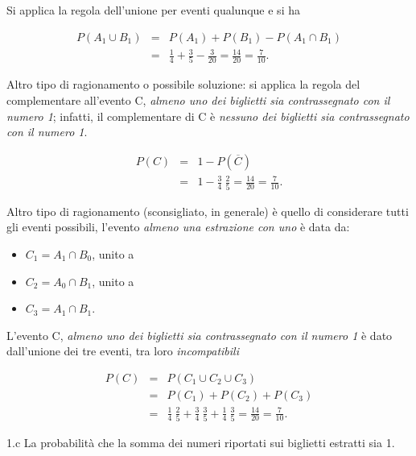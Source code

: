 \documentclass[
  11pt,
]{book}
\providecommand{\tightlist}{%
  \setlength{\itemsep}{0pt}\setlength{\parskip}{0pt}}
\theoremstyle{mytheoremstyle}
\theoremstyle{mydefstyle}
\newenvironment{sol}
  {
  \begin{tcolorbox}[enhanced,breakable,arc=0.1mm,boxrule=1pt,colback=white,colframe=iblue,
  title=\bf \fontfamily{lmss}\selectfont \hspace{.5 cm} Soluzione,drop fuzzy shadow]

}{
\end{tcolorbox}
  }
\begin{document}
\begin{sol}
Si applica la regola dell'unione per eventi qualunque e si ha

\begin{eqnarray*}
    P(A_1 \cup B_1)
&=& P(A_1)+P(B_1)-P(A_1\cap B_1) \\
&=& \frac{1}{4}+ \frac{3}{5}-\frac{3}{20}
 =  \frac{14}{20}
 =  \frac{7}{10}  .
\end{eqnarray*}

Altro tipo di ragionamento o possibile soluzione: si applica la
regola del complementare all'evento C, \emph{almeno uno dei biglietti sia contrassegnato con il numero 1};
infatti, il complementare di
C è \emph{nessuno dei biglietti sia contrassegnato con il numero 1}.

\begin{eqnarray*}
    P(C)
&=& 1 - P(\overline{C}) \\
&=& 1 - \frac{3}{4}\ \frac{2}{5}
 =  \frac{14}{20}
 =  \frac{7}{10}  .
\end{eqnarray*}

Altro tipo di ragionamento (sconsigliato, in generale) è quello
di considerare tutti gli eventi possibili, l'evento \emph{almeno una estrazione con uno} è data da:

\begin{itemize}
\tightlist
\item
  \(C_{1}=A_1 \cap B_0\), unito a
\item
  \(C_{2}=A_0 \cap B_1\), unito a
\item
  \(C_{3}=A_1 \cap B_1\).
\end{itemize}

L'evento C, \emph{almeno uno dei biglietti sia contrassegnato con il numero 1} è dato dall'unione dei tre eventi, tra loro
\emph{incompatibili}

\begin{eqnarray*}
    P(C)
&=& P(C_{1} \cup C_{2} \cup C_{3}) \\
&=& P(C_{1}) + P(C_{2}) + P(C_{3}) \\
&=& \frac{1}{4}\ \frac{2}{5} + \frac{3}{4}\ \frac{3}{5} +
    \frac{1}{4}\ \frac{3}{5}
 =  \frac{14}{20}
 =  \frac{7}{10}  .
\end{eqnarray*}

\end{sol}

1.c La probabilità che la somma dei numeri riportati sui
biglietti estratti sia 1.
\end{document}
